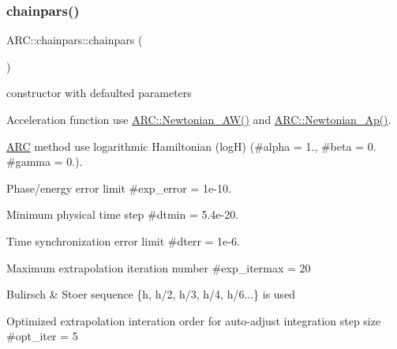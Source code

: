 \subsubsection{\texorpdfstring{chainpars()}{chainpars()}\hspace{0.1cm}{\footnotesize\ttfamily [1/2]}}
{\footnotesize\ttfamily A\+R\+C\+::chainpars\+::chainpars (\begin{DoxyParamCaption}{ }\end{DoxyParamCaption})\hspace{0.3cm}{\ttfamily [inline]}}



constructor with defaulted parameters 


\begin{DoxyItemize}
\item Acceleration function use \hyperlink{namespaceARC_a0f1e14e6d00b38d9f98f0eecf523feaa}{A\+R\+C\+::\+Newtonian\+\_\+\+A\+W()} and \hyperlink{namespaceARC_a6b8ee871e0832b6b59968ea9069877e0}{A\+R\+C\+::\+Newtonian\+\_\+\+Ap()}.
\item \hyperlink{namespaceARC}{A\+RC} method use logarithmic Hamiltonian (logH) (\#alpha = 1., \#beta = 0. \#gamma = 0.).
\item Phase/energy error limit \#exp\+\_\+error = 1e-\/10.
\item Minimum physical time step \#dtmin = 5.\+4e-\/20.
\item Time synchronization error limit \#dterr = 1e-\/6.
\item Maximum extrapolation iteration number \#exp\+\_\+itermax = 20
\item Bulirsch \& Stoer sequence \{h, h/2, h/3, h/4, h/6...\} is used
\item Optimized extrapolation interation order for auto-\/adjust integration step size \#opt\+\_\+iter = 5 
\end{DoxyItemize}\hypertarget{classARC_1_1chainpars_a91f5e98d8c936357b88a85e91924d2a2}{}\label{classARC_1_1chainpars_a91f5e98d8c936357b88a85e91924d2a2} 
